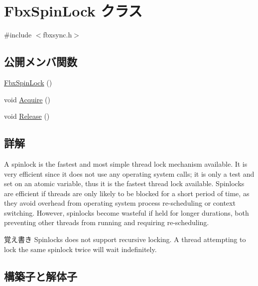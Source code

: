 \hypertarget{class_fbx_spin_lock}{}\section{Fbx\+Spin\+Lock クラス}
\label{class_fbx_spin_lock}


{\ttfamily \#include $<$fbxsync.\+h$>$}

\subsection*{公開メンバ関数}
\begin{DoxyCompactItemize}
\item 
\hyperlink{class_fbx_spin_lock_acc9c64f44e1834c2af5ab56a5a06266e}{Fbx\+Spin\+Lock} ()
\item 
void \hyperlink{class_fbx_spin_lock_a6f5aa93e51e6bd4717337bfb2216c371}{Acquire} ()
\item 
void \hyperlink{class_fbx_spin_lock_a3cc819cf0168dfc482696650b32c07f6}{Release} ()
\end{DoxyCompactItemize}


\subsection{詳解}
A spinlock is the fastest and most simple thread lock mechanism available. It is very efficient since it does not use any operating system calls; it is only a test and set on an atomic variable, thus it is the fastest thread lock available. Spinlocks are efficient if threads are only likely to be blocked for a short period of time, as they avoid overhead from operating system process re-\/scheduling or context switching. However, spinlocks become wasteful if held for longer durations, both preventing other threads from running and requiring re-\/scheduling. \begin{DoxyNote}{覚え書き}
Spinlocks does not support recursive locking. A thread attempting to lock the same spinlock twice will wait indefinitely. 
\end{DoxyNote}


\subsection{構築子と解体子}
\mbox{\label{class_fbx_spin_lock_acc9c64f44e1834c2af5ab56a5a06266e}} 
